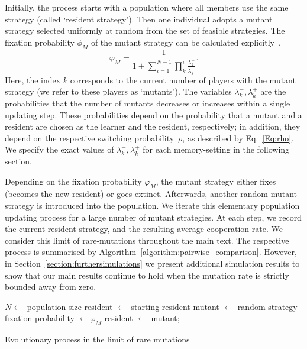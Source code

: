 \documentclass[11pt]{article}
\theoremstyle{plainCl1}
\theoremstyle{plainCl2}
\begin{document}

Initially, the process starts with a population where all members use the same strategy (called `resident strategy'). 
Then one individual adopts a mutant strategy selected uniformly at random from the set of feasible strategies.
The fixation probability \(\phi_{M}\) of the mutant strategy can be calculated explicitly~\citep{nowak:Nature:2004},
\begin{equation}\label{eq:appendix_fixation_probability}
    \varphi_{M} = \frac{1}{1+\sum\limits_{i=1}^{N-1}\prod\limits_k^i \frac{\lambda^-_k}{\lambda^+_k}}.
\end{equation}
Here, the index $k$ corresponds to the current number of players with the mutant strategy (we refer to these players as `mutants'). 
The variables \(\lambda^-_k, \lambda^+_k\) are the probabilities that the number of mutants decreases or increases within a single updating step. 
These probabilities depend on the probability that a mutant and a resident are chosen as the learner and the resident, respectively; 
in addition, they depend on the respective switching probability~$\rho$, as described by Eq.~\eqref{Eq:rho}. 
We specify the exact values of  \(\lambda^-_k, \lambda^+_k\) for each memory-setting in the following section. 

Depending on the fixation probability \(\varphi_{M}\), the mutant strategy either fixes (becomes the new resident) or goes extinct. 
Afterwards, another random mutant strategy is introduced into the population. 
We iterate this elementary population updating process for a large number of mutant strategies. 
At each step, we record the current resident strategy, and the resulting average cooperation rate. 
We consider this limit of rare-mutations throughout the main text. 
The respective process is summarised by Algorithm~\ref{algorithm:pairwise_comparison}.
However, in Section~\ref{section:furthersimulations} we present additional simulation results to show that our main results continue to hold when the mutation rate is strictly bounded away from zero. 


\begin{algorithm}[t]
  \SetAlgoLined
  $N \leftarrow$ population size\;
  resident $\leftarrow$ starting resident\;
   {mutant $\leftarrow$ random strategy\;
   fixation probability $\leftarrow \varphi_M $\;
   {resident $\leftarrow$ mutant;}}
   \caption{Evolutionary process in the limit of rare mutations}\label{algorithm:pairwise_comparison}
\end{algorithm}
\end{document}
